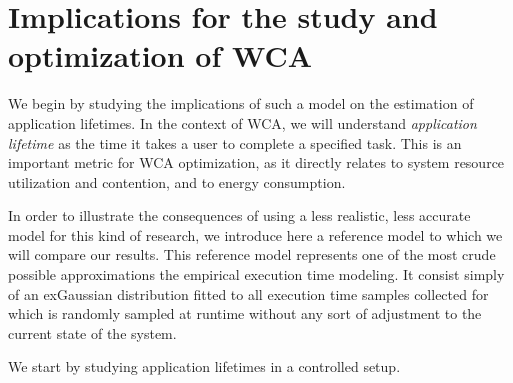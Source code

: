 \section{Implications for the study and optimization of \acs{WCA}}\label{sec:implications}

We begin by studying the implications of such a model on the estimation of application lifetimes.
In the context of \ac{WCA}, we will understand \emph{application lifetime} as the time it takes a user to complete a specified task.
This is an important metric for \ac{WCA} optimization, as it directly relates to system resource utilization and contention, and to energy consumption.

In order to illustrate the consequences of using a less realistic, less accurate model for this kind of research, we introduce here a reference model to which we will compare our results.
This reference model represents one of the most crude possible approximations the empirical execution time modeling.
It consist simply of an \ac{exGaussian} distribution fitted to all execution time samples collected for \textcite{olguinmunoz:impact2021} which is randomly sampled at runtime without any sort of adjustment to the current state of the system.

We start by studying application lifetimes in a controlled setup.
